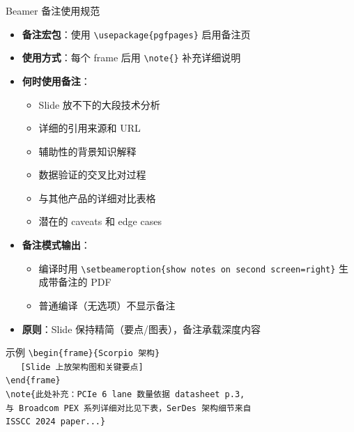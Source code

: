 \documentclass[UTF8,11pt,aspectratio=169]{beamer}
\begin{document}
\begin{frame}{Beamer 备注使用规范}
    \begin{itemize}
        \item \textbf{备注宏包}：使用 \texttt{\textbackslash usepackage\{pgfpages\}} 启用备注页
        \item \textbf{使用方式}：每个 frame 后用 \texttt{\textbackslash note\{\}} 补充详细说明
        \item \textbf{何时使用备注}：
            \begin{itemize}
                \item Slide 放不下的大段技术分析
                \item 详细的引用来源和 URL
                \item 辅助性的背景知识解释
                \item 数据验证的交叉比对过程
                \item 与其他产品的详细对比表格
                \item 潜在的 caveats 和 edge cases
            \end{itemize}
        \item \textbf{备注模式输出}：
            \begin{itemize}
                \item 编译时用 \texttt{\textbackslash setbeameroption\{show notes on second screen=right\}} 生成带备注的 PDF
                \item 普通编译（无选项）不显示备注
            \end{itemize}
        \item \textbf{原则}：Slide 保持精简（要点/图表），备注承载深度内容
    \end{itemize}

    \begin{exampleblock}{示例}
        \texttt{\textbackslash begin\{frame\}\{Scorpio 架构\}} \\
        \texttt{~~~[Slide 上放架构图和关键要点]} \\
        \texttt{\textbackslash end\{frame\}} \\
        \texttt{\textbackslash note\{此处补充：PCIe 6 lane 数量依据 datasheet p.3,} \\
        \texttt{与 Broadcom PEX 系列详细对比见下表，SerDes 架构细节来自} \\
        \texttt{ISSCC 2024 paper...\}}
    \end{exampleblock}
\end{frame}
\end{document}
